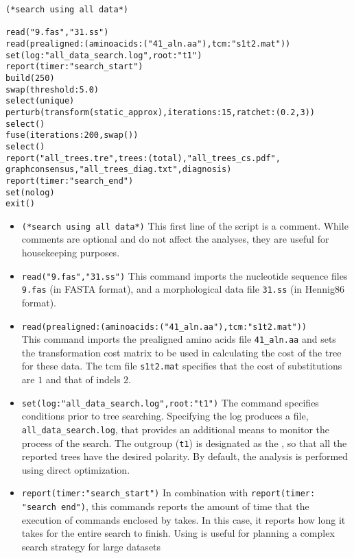 \begin{verbatim}
(*search using all data*)

read("9.fas","31.ss")
read(prealigned:(aminoacids:("41_aln.aa"),tcm:"s1t2.mat"))
set(log:"all_data_search.log",root:"t1")
report(timer:"search_start")
build(250)
swap(threshold:5.0)
select(unique)
perturb(transform(static_approx),iterations:15,ratchet:(0.2,3))
select()
fuse(iterations:200,swap())
select()
report("all_trees.tre",trees:(total),"all_trees_cs.pdf",
graphconsensus,"all_trees_diag.txt",diagnosis)
report(timer:"search_end")
set(nolog)
exit()
\end{verbatim}

\begin{itemize}
\item \texttt{(*search using all data*)} This first line of the
script is a comment. While comments are optional and do not affect
the analyses, they are useful for housekeeping purposes. 
\item \texttt{read("9.fas","31.ss")} This command imports the nucleotide
sequence files \texttt{9.fas} (in FASTA format), and a morphological
data file \texttt{31.ss} (in Hennig86 format).  
\item \texttt{read(prealigned:(aminoacids:("41\_aln.aa"),tcm:"s1t2.mat"))}\\
This command imports the prealigned amino acids file \texttt{41\_aln.aa}
and sets the transformation cost matrix to be used in calculating
the cost of the tree for these data.  The tcm file \texttt{s1t2.mat}
specifies that the cost of substitutions are $1$ and that of indels
$2$. 
\item \texttt{set(log:"all\_data\_search.log",root:"t1")} The
 command specifies conditions prior to tree searching.
Specifying the log produces a file, \texttt{all\_data\_search.log},
that provides an additional means to monitor the process of the
search. The outgroup (\texttt{t1}) is designated as the ,
so that all the reported trees have the desired polarity. By default,
the analysis is performed using direct optimization.  
\item \texttt{report(timer:"search\_start")} In combination with
\texttt{report(timer:\\"search end")}, this commands reports the
amount of time that the execution of commands enclosed by
 takes. In this case, it reports how long it
takes for the entire search to finish. Using 
is useful for planning a complex search strategy for large datasets

\end{itemize}
